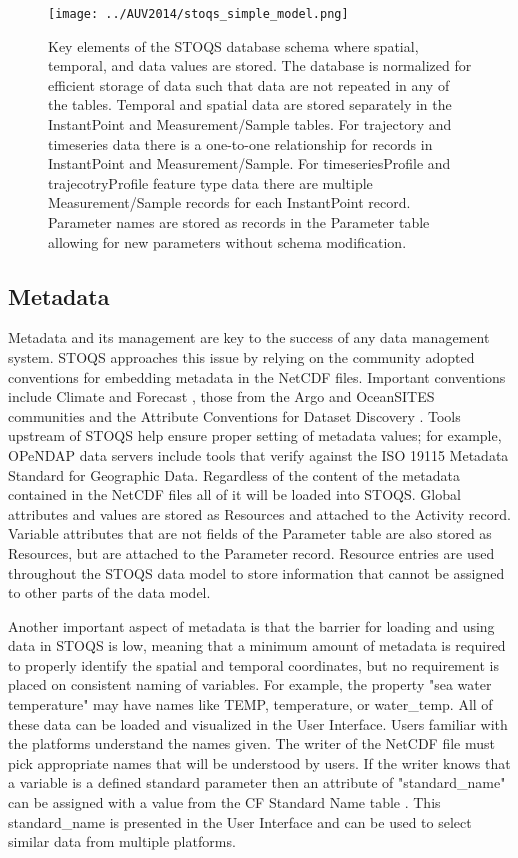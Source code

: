 \documentclass[conference]{IEEEtran}
\begin{document}
\begin{figure}[htbp]
\centering
\texttt{[image: ../AUV2014/stoqs\_simple\_model.png]}
\caption{Key elements of the STOQS database schema where spatial, temporal, and data 
values are stored. The database is normalized for efficient storage of data such 
that data are not repeated in any of the tables. Temporal and spatial data are stored 
separately in the InstantPoint and Measurement/Sample tables. For trajectory and 
timeseries data there is a one-to-one relationship for records in InstantPoint and 
Measurement/Sample. For timeseriesProfile and trajecotryProfile feature type data 
there are multiple Measurement/Sample records for each InstantPoint record. 
Parameter names are stored as records in the Parameter table allowing for new 
parameters without schema modification.}
\label{fig:stoqs_simple_model}
\end{figure}

\subsection{Metadata}

Metadata and its management are key to the success of any data management system. 
STOQS approaches this issue by relying on the community adopted conventions for 
embedding metadata in the NetCDF files. Important conventions include Climate and 
Forecast \cite{CF}, those from the Argo and OceanSITES communities \cite{Pouliquen2006} 
and the Attribute Conventions for Dataset Discovery \cite{ACDD}. Tools upstream 
of STOQS help ensure proper setting of metadata values; for example, OPeNDAP data 
servers include tools that verify against the ISO 19115 Metadata Standard for 
Geographic Data. Regardless of the content of the metadata contained in the NetCDF 
files all of it will be loaded into STOQS. Global attributes and values are stored 
as Resources and attached to the Activity record. Variable attributes that are not 
fields of the Parameter table are also stored as Resources, but are attached to the 
Parameter record. Resource entries are used throughout the STOQS data model to store 
information that cannot be assigned to other parts of the data model.

Another important aspect of metadata is that the barrier for loading and using data in 
STOQS is low, meaning that a minimum amount of metadata is required to properly 
identify the spatial and temporal coordinates, but no requirement is placed on 
consistent naming of variables. For example, the property "sea water temperature" may 
have names like TEMP, temperature, or water\_temp. All of these data can be loaded and 
visualized in the User Interface. Users familiar with the platforms understand the names 
given. The writer of the NetCDF file must pick appropriate names that will be understood 
by users. If the writer knows that a variable is a defined standard parameter then an 
attribute of "standard\_name" can be assigned with a value from the CF Standard Name 
table \cite{CFSN}. This standard\_name is presented in the User Interface and can be 
used to select similar data from multiple platforms.
\end{document}
